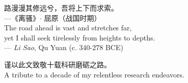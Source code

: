 \cleardoublepage
\thispagestyle{empty}


\vspace*{3cm}

\begin{CJK*}{UTF8}{gbsn}
    \begin{raggedleft}
        路漫漫其修远兮，吾将上下而求索。\\
        ---《离骚》$\cdot$ 屈原（战国时期）\\
        The road ahead is vast and stretches far, \\
        yet I shall seek tirelessly from heights to depths. \\
        --- \textit{Li Sao}, Qu Yuan (c. 340-278 BCE)\\
    \end{raggedleft}
\end{CJK*}

\vspace{4cm}

\begin{center}
    \begin{CJK*}{UTF8}{gbsn}
        谨以此文致敬十载科研磨砺之路。\\
        A tribute to a decade of my relentless research endeavors.
    \end{CJK*}
\end{center}



